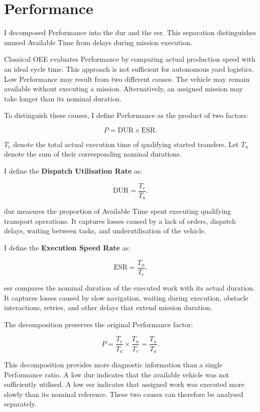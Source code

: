 \section{Performance}
\label{sec:performance}

I decomposed Performance into the \gls{dur} and the \gls{esr}. This separation distinguishes unused Available Time from delays during mission execution.

Classical OEE evaluates Performance by comparing actual production speed with an ideal cycle time. This approach is not sufficient for autonomous yard logistics. Low Performance may result from two different causes. The vehicle may remain available without executing a mission. Alternatively, an assigned mission may take longer than its nominal duration.

To distinguish these causes, I define Performance as the product of two factors:

\[
P = \mathrm{DUR} \times \mathrm{ESR}.
\]

$T_e$ denote the total actual execution time of qualifying started transfers. Let $T_n$ denote the sum of their corresponding nominal durations.

I define the \textbf{Dispatch Utilisation Rate} as:

\[
\mathrm{DUR} = \frac{T_e}{T_a}.
\]

\gls{dur} measures the proportion of Available Time spent executing qualifying transport operations. It captures losses caused by a lack of orders, dispatch delays, waiting between tasks, and underutilisation of the vehicle.

I define the \textbf{Execution Speed Rate} as:

\[
\mathrm{ESR} = \frac{T_n}{T_e}.
\]

\gls{esr} compares the nominal duration of the executed work with its actual duration. It captures losses caused by slow navigation, waiting during execution, obstacle interactions, retries, and other delays that extend mission duration.

The decomposition preserves the original Performance factor:

\[
P = \frac{T_e}{T_a} \times \frac{T_n}{T_e} = \frac{T_n}{T_a}.
\]

This decomposition provides more diagnostic information than a single Performance ratio. A low \acrshort{dur} indicates that the available vehicle was not sufficiently utilised. A low \acrshort{esr} indicates that assigned work was executed more slowly than its nominal reference. These two causes can therefore be analysed separately.

